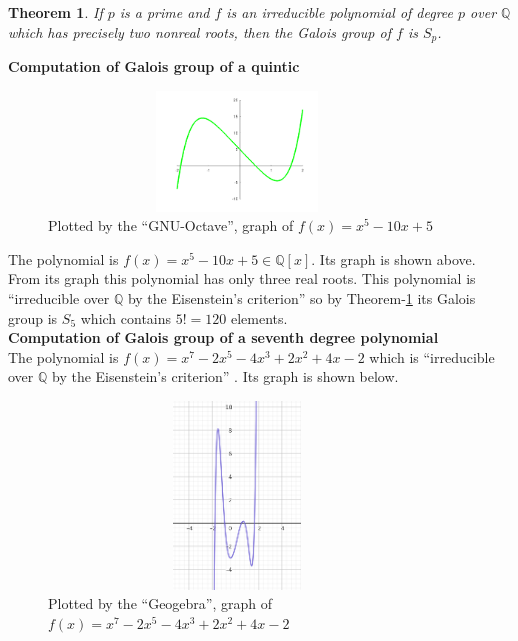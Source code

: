 \documentclass[a4paper,twoside,10pt]{article}
\theoremstyle{plain}
\newtheorem{theorem}{Theorem}[section]
\theoremstyle{definition}
\begin{document}
\begin{theorem} \cite{hunger}
  \label{quintic}
If \(p\) is a prime and \(f\) is an irreducible polynomial of degree \(p\) over \(\mathbb{Q}\) which has precisely two nonreal roots, then the Galois group of \(f\) is \(S_p\).
\end{theorem}

\textbf{Computation of Galois group of a quintic}\\

\begin{figure}[h!]
  \centering
  \label{quintic-fig}
  \includegraphics[width=10cm, height=3.2cm]{quantic2.png}
  \caption{\footnotesize Plotted by the ``GNU-Octave'', graph of \(f(x)=x^5-10x+5\) }
\end{figure}
\noindent
The polynomial is \(f(x)=x^5-10x+5 \in \mathbb{Q}[x]\). Its graph is shown above.  From its graph this polynomial has only three real roots. This polynomial is ``irreducible over \(\mathbb{Q}\) by the Eisenstein's criterion'' \cite{hunger} so by Theorem-{\ref{quintic}} its Galois group is \(S_5\) which contains \(5!=120\) elements.\\
\noindent
\textbf{Computation of Galois group of a seventh degree polynomial}\\
The polynomial is \(f(x)=x^7-2x^5-4x^3+2x^2+4x-2\) which is ``irreducible over \(\mathbb{Q}\) by the Eisenstein's criterion'' \cite{hunger}. Its graph is shown below.

\begin{figure}[h!]
  \centering
  \includegraphics[width=10cm, height=5cm]{seventh2.png}
  \caption{\footnotesize Plotted by the ``Geogebra'', graph of \(f(x)=x^7-2x^5-4x^3+2x^2+4x-2\)}
\end{figure}
\end{document}
